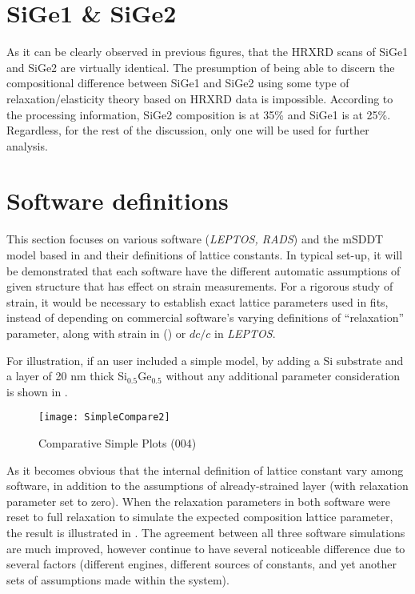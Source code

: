 \section{SiGe1 \& SiGe2}

As it can be clearly observed in previous figures, that the HRXRD scans of SiGe1 and SiGe2 are virtually identical.  The presumption of being able to discern the compositional difference between SiGe1 and SiGe2 using some type of relaxation/elasticity theory based on HRXRD data is impossible.  According to the processing information, SiGe2 composition is at 35\% and SiGe1 is at 25\%.  Regardless, for the rest of the discussion, only one will be used for further analysis.

\section{Software definitions}
This section focuses on various software ({\textit{LEPTOS, RADS}}) and the mSDDT model based in \MathLogo and their definitions of lattice constants.  In typical set-up, it will be demonstrated that each software have the different automatic assumptions of given structure that has effect on strain measurements.  For a rigorous study of strain, it would be necessary to establish exact lattice parameters used in fits, instead of depending on commercial software's varying definitions of ``relaxation'' parameter, along with strain in (\RADS) or $dc/c$ in {\textit{LEPTOS}}.

For illustration, if an user included a simple model, by adding a Si substrate and a layer of 20 nm thick Si$_{0.5}$Ge$_{0.5}$ without any additional parameter consideration is shown in .
\begin{figure}[ht]%
\caption{Comparative Simple Plots (004)}
\label{CSP}
\begin{minipage}{0.85\linewidth}
\texttt{[image: SimpleCompare2]}
\end{minipage}
\end{figure}

As it becomes obvious that the internal definition of lattice constant vary among software, in addition to the assumptions of already-strained layer (with relaxation parameter set to zero).  When the relaxation parameters in both software were reset to full relaxation to simulate the expected composition lattice parameter, the result is illustrated in .  The agreement between all three software simulations are much improved, however continue to have several noticeable difference due to several factors (different engines, different sources of constants, and yet another sets of assumptions made within the system).

